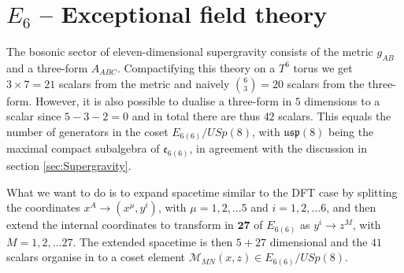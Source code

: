 \section{$E_6$ -- Exceptional field theory \label{sec:E6}}
The bosonic sector of eleven-dimensional supergravity consists of the metric $g_{AB}$ and a three-form $A_{ABC}$. Compactifying this theory on a $T^6$ torus we get $3\times 7=21$ scalars from the metric and naively ${{6}\choose{3}}=20$ scalars from the three-form. However, it is also possible to dualise a three-form in $5$ dimensions to a scalar since $5-3-2=0$ and in total there are thus $42$ scalars. This equals the number of generators in the coset $E_{6(6)}/USp(8)$, with $\mathfrak{usp}(8)$ being the maximal compact subalgebra of $\mathfrak{e}_{6(6)}$, in agreement with the discussion in section \ref{sec:Supergravity}. 

What we want to do is to expand spacetime similar to the DFT case by splitting the coordinates $x^A\to (x^\mu,y^i)$, with $\mu=1,2,\ldots 5$ and $i = 1,2,\ldots 6$, and then extend the internal coordinates to transform in $\mathbf{27}$ of $E_{6(6)}$ as $y^i\to z^M$, with $M=1,2,\ldots 27$. The extended spacetime is then $5+27$ dimensional and the $41$ scalars organise in to a coset element $\mathcal{M}_{MN}(x,z)\in E_{6(6)}/USp(8)$. 

